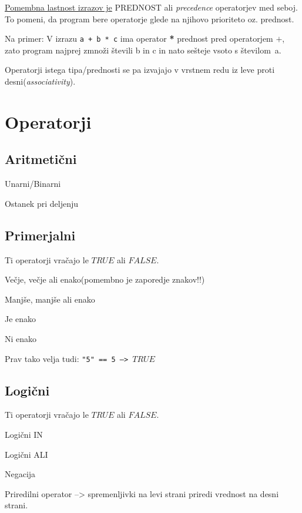 \underline{Pomembna lastnost izrazov je} PREDNOST ali \textit{precedence} operatorjev med seboj. To pomeni, da program bere operatorje glede na njihovo prioriteto  oz. prednost.\

Na primer: V izrazu \texttt{a + b * c} ima operator \textbf{*} prednost pred operatorjem $+$, zato program najprej zmnoži števili b in c in nato sešteje vsoto s številom~a.\

Operatorji istega tipa/prednosti se pa izvajajo v vrstnem redu iz leve proti desni(\textit{associativity}).
\newpage
\section{Operatorji}

\subsection{Aritmetični}

\begin{description}[align=left,labelwidth=3cm]
	\item[$+, -$] Unarni/Binarni
	\item[$\times, \div$]
	\item[$\%$] Ostanek pri deljenju
\end{description}

\subsection{Primerjalni}
Ti operatorji vračajo le $TRUE$ ali $FALSE$.\

\begin{description}[align=left,labelwidth=3cm]
	\item [$>, >=$]	Večje, večje ali enako(pomembno je zaporedje znakov!!)
	\item [$<, <=$]	Manjše, manjše ali enako
	\item [$==$] Je enako	
	\item [$!=$] Ni enako
\end{description} 

Prav tako velja tudi: \texttt{"5"~==~5 --> $TRUE$}

\subsection{Logični}

Ti operatorji vračajo le $TRUE$ ali $FALSE$.\

\begin{description}[align=left,labelwidth=3cm]
	\item [$\&\&$] Logični IN
	\item [$||$] Logični ALI
	\item [$!$] Negacija
	\item [$=$] Priredilni operator --> spremenljivki na levi strani priredi vrednost na desni strani.
\end{description}


